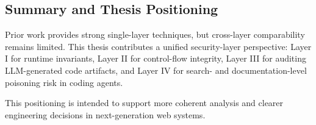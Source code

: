 \subsection{Summary and Thesis Positioning}

Prior work provides strong single-layer techniques,
but cross-layer comparability remains limited.
This thesis contributes a unified security-layer perspective:
Layer I for runtime invariants,
Layer II for control-flow integrity,
Layer III for auditing LLM-generated code artifacts,
and Layer IV for search- and documentation-level poisoning risk in coding agents.

This positioning is intended to support more coherent analysis and clearer engineering 
decisions in next-generation web systems.
